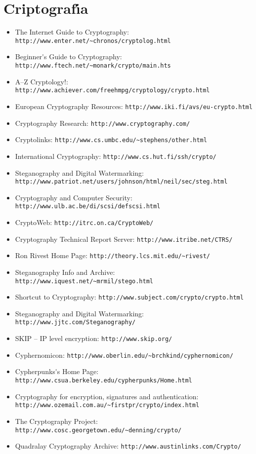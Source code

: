 \section{Criptograf\'{\i}a}
\begin{itemize}
\item The Internet Guide to Cryptography: {\tt http://www.enter.net/\~{}chronos/cryptolog.html}
\item Beginner\'{}s Guide to Cryptography: {\tt http://www.ftech.net/\~{}monark/crypto/main.hts}
\item A--Z Cryptology!: {\tt http://www.achiever.com/freehmpg/cryptology/crypto.html}
\item European Cryptography Resources: {\tt http://www.iki.fi/avs/eu-crypto.html}
\item Cryptography Research: {\tt http://www.cryptography.com/}
\item Cryptolinks: {\tt http://www.cs.umbc.edu/\~{}stephens/other.html}
\item International Cryptography: {\tt http://www.cs.hut.fi/ssh/crypto/}
\item Steganography and Digital Watermarking:\\
{\tt http://www.patriot.net/users/johnson/html/neil/sec/steg.html}
\item Cryptography and Computer Security: {\tt http://www.ulb.ac.be/di/scsi/defscsi.html}
\item CryptoWeb: {\tt http://itrc.on.ca/CryptoWeb/}
\item Cryptography Technical Report Server: {\tt http://www.itribe.net/CTRS/}
\item Ron Rivest Home Page: {\tt http://theory.lcs.mit.edu/\~{}rivest/}
\item Steganography Info and Archive: {\tt http://www.iquest.net/\~{}mrmil/stego.html}
\item Shortcut to Cryptography: {\tt http://www.subject.com/crypto/crypto.html}
\item Steganography and Digital Watermarking: 
{\tt http://www.jjtc.com/Steganography/}
\item SKIP -- IP level encryption: {\tt http://www.skip.org/}
\item Cyphernomicon: {\tt http://www.oberlin.edu/\~{}brchkind/cyphernomicon/}
\item Cypherpunks\'{}s Home Page: {\tt http://www.csua.berkeley.edu/cypherpunks/Home.html}
\item Cryptography for encryption, signatures and authentication:\\
{\tt http://www.ozemail.com.au/\~{}firstpr/crypto/index.html}
\item The Cryptography Project: {\tt http://www.cosc.georgetown.edu/\~{}denning/crypto/}
\item Quadralay Cryptography Archive: {\tt http://www.austinlinks.com/Crypto/}
\end{itemize}
